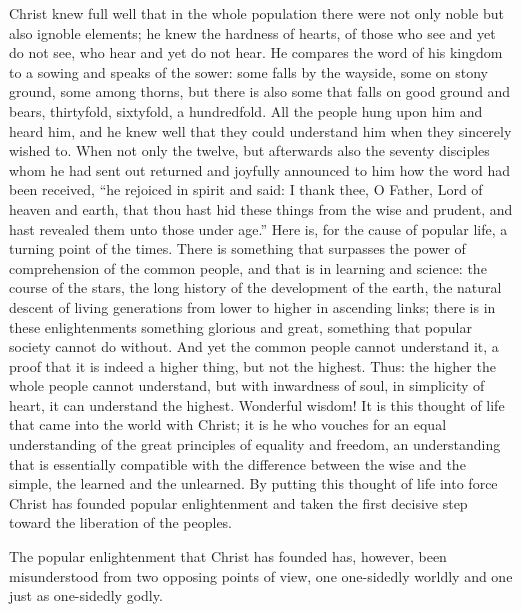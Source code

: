 \documentclass[12pt,a4paper,openany]{book}
\newcommand{\opage}[1]{\marginnote{\footnotesize\textit{[#1]}}}
\begin{document}
Christ knew full well that in the whole population there were not only noble but also ignoble elements; he knew the hardness of hearts, of those who see and yet do not see, who hear and yet do not hear. He compares the word of his kingdom to a sowing and speaks of the sower: some falls by the wayside, some on stony ground, some among thorns, but there is also
\setcounter{footnote}{0}%
\opage{25}some that falls on good ground and bears, thirtyfold, sixtyfold, a hundredfold. All the people hung upon him and heard him, and he knew well that they could understand him when they sincerely wished to. When not only the twelve, but afterwards also the seventy disciples whom he had sent out returned and joyfully announced to him how the word had been received, ``he rejoiced in spirit and said: I thank thee, O Father, Lord of heaven and earth, that thou hast hid these things from the wise and prudent, and hast revealed them unto those under age.'' Here is, for the cause of popular life, a turning point of the times. There is something that surpasses the power of comprehension of the common people, and that is in learning and science: the course of the stars, the long history of the development of the earth, the natural descent of living generations from lower to higher in ascending links; there is in these enlightenments something glorious and great, something that popular society cannot do without. And yet the common people cannot understand it, a proof that it is indeed a higher thing, but not the highest. Thus: the higher the whole people cannot understand, but with inwardness of soul, in simplicity of heart, it can understand the highest. Wonderful wisdom! It is this thought of life that came into the world with Christ; it is he who vouches for an equal understanding of the great principles of equality and freedom, an understanding that is essentially compatible with the difference between the wise and the simple, the learned and the unlearned. By putting this thought of life into force Christ has founded popular enlightenment and taken the first decisive step toward the liberation of the peoples.

The popular enlightenment that Christ has founded has, however,
\setcounter{footnote}{0}%
\opage{26}been misunderstood from two opposing points of view, one one-sidedly worldly and one just as one-sidedly godly.
\end{document}
